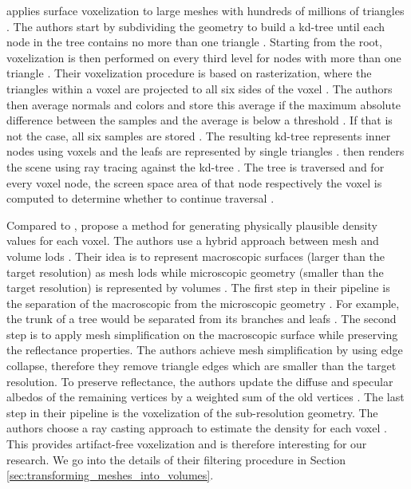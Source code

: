 \citeauthor{afra_voxel_lods} applies surface voxelization to large meshes with hundreds of millions of triangles \cite{afra_voxel_lods}.
The authors start by subdividing the geometry to build a kd-tree until each node in the tree contains no more than one triangle \cite{afra_voxel_lods}.
Starting from the root, voxelization is then performed on every third level for nodes with more than one triangle \cite{afra_voxel_lods}.
Their voxelization procedure is based on rasterization, where the triangles within a voxel are projected to all six sides of the voxel \cite{afra_voxel_lods}.
The authors then average normals and colors and store this average if the maximum absolute difference between the samples and the average is below a threshold \cite{afra_voxel_lods}.
If that is not the case, all six samples are stored \cite{afra_voxel_lods}.
The resulting kd-tree represents inner nodes using voxels and the leafs are represented by single triangles \cite{afra_voxel_lods}.
\citeauthor{afra_voxel_lods} then renders the scene using ray tracing against the kd-tree \cite{afra_voxel_lods}.
The tree is traversed and for every voxel node, the screen space area of that node respectively the voxel is computed to determine whether to continue traversal \cite{afra_voxel_lods}.

Compared to \citeauthor{afra_voxel_lods}, \citeauthor{hybrid_mesh_volume_lods} propose a method for generating physically plausible density values for each voxel.
The authors use a hybrid approach between mesh and volume \acp{lod} \cite{hybrid_mesh_volume_lods}.
Their idea is to represent macroscopic surfaces (larger than the target resolution) as mesh \acsp{lod} while microscopic geometry (smaller than the target resolution) is represented by volumes \cite{hybrid_mesh_volume_lods}.
The first step in their pipeline is the separation of the macroscopic from the microscopic geometry \cite{hybrid_mesh_volume_lods}.
For example, the trunk of a tree would be separated from its branches and leafs \cite{hybrid_mesh_volume_lods}.
The second step is to apply mesh simplification on the macroscopic surface while preserving the reflectance properties.
The authors achieve mesh simplification by using edge collapse, therefore they remove triangle edges which are smaller than the target resolution.
To preserve reflectance, the authors update the diffuse and specular albedos of the remaining vertices by a weighted sum of the old vertices \cite{hybrid_mesh_volume_lods}.
The last step in their pipeline is the voxelization of the sub-resolution geometry.
The authors choose a ray casting approach to estimate the density for each voxel \cite{hybrid_mesh_volume_lods}.
This provides artifact-free voxelization and is therefore interesting for our research.
We go into the details of their filtering procedure in Section \ref{sec:transforming_meshes_into_volumes}.





